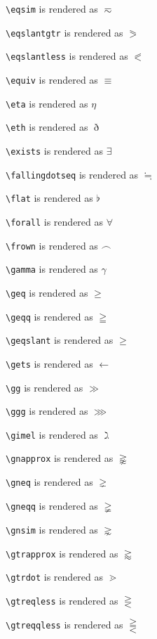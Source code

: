 \texttt{\textbackslash eqsim} is rendered as $\eqsim$

\texttt{\textbackslash eqslantgtr} is rendered as $\eqslantgtr$

\texttt{\textbackslash eqslantless} is rendered as $\eqslantless$

\texttt{\textbackslash equiv} is rendered as $\equiv$

\texttt{\textbackslash eta} is rendered as $\eta$

\texttt{\textbackslash eth} is rendered as $\eth$

\texttt{\textbackslash exists} is rendered as $\exists$

\texttt{\textbackslash fallingdotseq} is rendered as $\fallingdotseq$

\texttt{\textbackslash flat} is rendered as $\flat$

\texttt{\textbackslash forall} is rendered as $\forall$

\texttt{\textbackslash frown} is rendered as $\frown$

\texttt{\textbackslash gamma} is rendered as $\gamma$

\texttt{\textbackslash geq} is rendered as $\geq$

\texttt{\textbackslash geqq} is rendered as $\geqq$

\texttt{\textbackslash geqslant} is rendered as $\geqslant$

\texttt{\textbackslash gets} is rendered as $\gets$

\texttt{\textbackslash gg} is rendered as $\gg$

\texttt{\textbackslash ggg} is rendered as $\ggg$

\texttt{\textbackslash gimel} is rendered as $\gimel$

\texttt{\textbackslash gnapprox} is rendered as $\gnapprox$

\texttt{\textbackslash gneq} is rendered as $\gneq$

\texttt{\textbackslash gneqq} is rendered as $\gneqq$

\texttt{\textbackslash gnsim} is rendered as $\gnsim$

\texttt{\textbackslash gtrapprox} is rendered as $\gtrapprox$

\texttt{\textbackslash gtrdot} is rendered as $\gtrdot$

\texttt{\textbackslash gtreqless} is rendered as $\gtreqless$

\texttt{\textbackslash gtreqqless} is rendered as $\gtreqqless$


